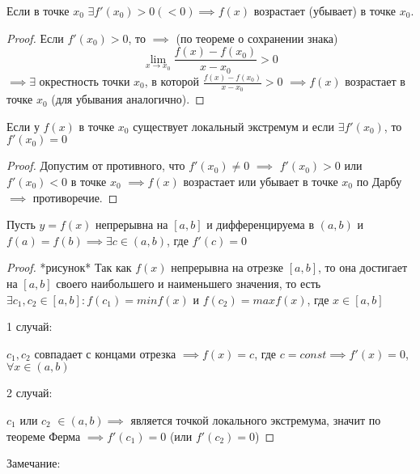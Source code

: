 \begin{theorem}
        Если в точке $x_0$ $\exists f'(x_0)>0 (<0) \implies f(x)$ возрастает (убывает) в точке $x_0$.
\end{theorem}
\begin{proof}
        Если $f'(x_0)>0$, то $\implies$ (по теореме о сохранении знака)
        \[\lim_{x\to x_0} \frac{f(x)-f(x_0)}{x-x_0}>0\] 
        $\implies \exists$ окрестность точки $x_0$, в которой $\frac{f(x)-f(x_0)}{x-x_0}>0$ $\implies f(x)$ возрастает в точке $x_0$ (для убывания аналогично).
\end{proof}

\begin{theorem}
        Если у $f(x)$ в точке $x_0$ существует локальный экстремум и если $\exists f'(x_0)$, то $f'(x_0)=0$
\end{theorem}
\begin{proof}
        Допустим от противного, что $f'(x_0) \neq 0$ $\implies$ $f'(x_0)>0$ или $f'(x_0)<0$ в точке $x_0$ $\implies f(x)$ возрастает или убывает в точке $x_0$ по Дарбу $\implies$ противоречие.
\end{proof}
\begin{theorem}
        Пусть $y = f(x)$ непрерывна на $[a,b]$ и дифференцируема в $(a, b)$ и $f(a) = f(b) \implies \exists c \in (a, b)$, где $f'(c)=0$ 
\end{theorem}
\begin{proof}
        *рисунок*
        Так как $f(x)$ непрерывна на отрезке $[a, b]$, то она достигает на $[a, b]$ своего наибольшего и наименьшего значения, то есть $\exists c_1,c_2 \in [a, b]:f(c_1)=min f(x)$ и $f(c_2)=max f(x)$, где $x \in [a, b]$

        1 случай:

        $c_1, c_2$ совпадает с концами отрезка $\implies f(x) = c$, где $c = const \implies f'(x)=0$, $\forall x \in (a, b)$
        
        2 случай:

        $c_1$ или $c_2$ $\in (a, b) \implies$ является точкой локального экстремума, значит по теореме Ферма $\implies f'(c_1) = 0$ (или $f'(c_2) = 0$)   
\end{proof}

    Замечание:

